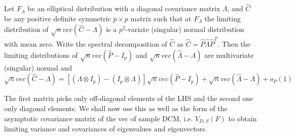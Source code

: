 \begin{Theorem} \label{Theorem:decomp} \citep{taskinen12}
Let $F_\Lambda$ be an elliptical distribution with a diagonal covariance matrix $\Lambda$, and $\hat C$ be any positive definite symmetric $p \times p$ matrix such that at $F_\Lambda$ the limiting distribution of $\sqrt n vec(\hat C - \Lambda)$ is a $p^2$-variate (singular) normal distribution with mean zero. Write the spectral decomposition of $\hat C$ as $\hat C = \hat P \hat\Lambda \hat P^T$. Then the limiting distributions of $\sqrt n vec(\hat P - I_p)$ and $\sqrt n vec(\hat\Lambda - \Lambda)$ are multivariate (singular) normal and
%
\begin{equation} \label{equation:decompEq}
\sqrt n vec (\hat C - \Lambda)  = \left[ (\Lambda \otimes I_p) - (I_p \otimes \Lambda) \right] \sqrt n vec (\hat P - I_p) + \sqrt n vec (\hat\Lambda - \Lambda) + o_P(1)
\end{equation}
\end{Theorem}

The first matrix picks only off-diagonal elements of the LHS and the second one only diagonal elements. We shall now use this as well as the form of the asymptotic covariance matrix of the vec of sample DCM, i.e. $V_{D,S}(F)$ to obtain limiting variance and covariances of eigenvalues and eigenvectors.

